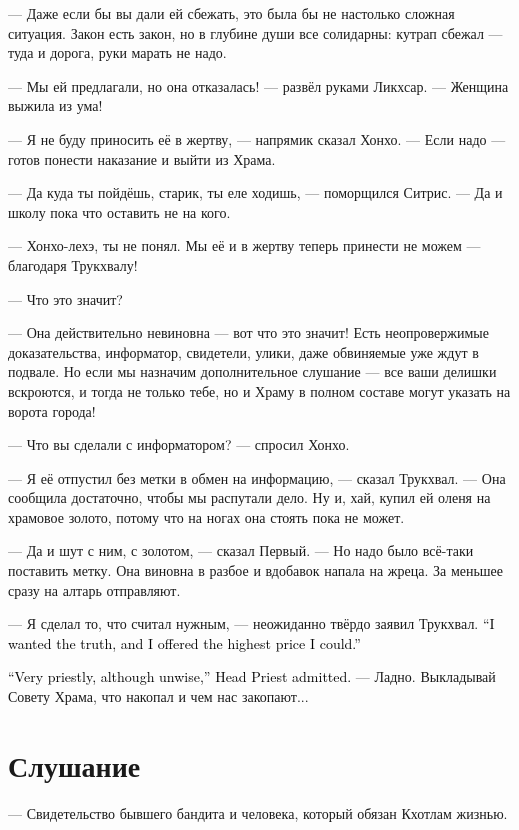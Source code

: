 \documentclass[a4paper,10pt,fleqn]{book}\usepackage{cooltooltips}\usepackage{polyglossia}\setdefaultlanguage{english}\setotherlanguage{russian}\defaultfontfeatures{Ligatures=TeX,Mapping=tex-text} \usepackage{xcolor}\definecolor{lightgray}{HTML}{bbbbbb}\color{lightgray}\newcommand{\ml}[3]{\textcolor{black}{#3}}
\begin{document}
--- Даже если бы вы дали ей сбежать, это была бы не настолько сложная ситуация.
Закон есть закон, но в глубине души все солидарны: кутрап сбежал --- туда и дорога, руки марать не надо.

--- Мы ей предлагали, но она отказалась! --- развёл руками Ликхсар.
--- Женщина выжила из ума!

--- Я не буду приносить её в жертву, --- напрямик сказал Хонхо.
--- Если надо --- готов понести наказание и выйти из Храма.

--- Да куда ты пойдёшь, старик, ты еле ходишь, --- поморщился Ситрис.
--- Да и школу пока что оставить не на кого.

--- Хонхо-лехэ, ты не понял.
Мы её и в жертву теперь принести не можем --- благодаря Трукхвалу!

--- Что это значит?

--- Она действительно невиновна --- вот что это значит!
Есть неопровержимые доказательства, информатор, свидетели, улики, даже обвиняемые уже ждут в подвале.
Но если мы назначим дополнительное слушание --- все ваши делишки вскроются, и тогда не только тебе, но и Храму в полном составе могут указать на ворота города!

--- Что вы сделали с информатором? --- спросил Хонхо.

--- Я её отпустил без метки в обмен на информацию, --- сказал Трукхвал.
--- Она сообщила достаточно, чтобы мы распутали дело.
Ну и, хай, купил ей оленя на храмовое золото, потому что на ногах она стоять пока не может.

--- Да и шут с ним, с золотом, --- сказал Первый.
--- Но надо было всё-таки поставить метку.
Она виновна в разбое и вдобавок напала на жреца.
За меньшее сразу на алтарь отправляют.

--- Я сделал то, что считал нужным, --- неожиданно твёрдо заявил Трукхвал.
\ml{$0$}
{--- Мне нужна была истина, и я предложил за неё самую высокую цену, какую мог предложить.}
{``I wanted the truth, and I offered the highest price I could.''}

\ml{$0$}
{--- Очень по-жречески, хоть и недальновидно, --- признал Первый.}
{``Very priestly, although unwise,'' Head Priest admitted.}
--- Ладно.
Выкладывай Совету Храма, что накопал и чем нас закопают...

\section{Слушание}

--- Свидетельство бывшего бандита и человека, который обязан Кхотлам жизнью.
\end{document}
